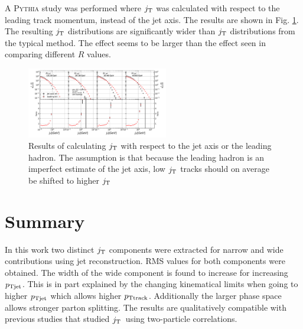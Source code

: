 A \textsc{Pythia} study was performed where $j_{\rm T}$ was calculated with respect to the leading track momentum, instead of the jet axis. The results are shown in Fig. \ref{fig:RefComparison}. The resulting $j_{\rm T}$ distributions are significantly wider than $j_{\rm T}$ distributions from the typical method. The effect seems to be larger than the effect seen in comparing different $R$ values.

\begin{figure}[htp]
\centering
\includegraphics[width=0.55\textwidth]{figures/results/JetVsLeadingRefConst.pdf}
\caption{Results of calculating $j_{\rm T}$ with respect to the jet axis or the leading hadron. The assumption is that because the leading hadron is an imperfect estimate of the jet axis, low $j_{\rm T}$ tracks should on average be shifted to higher $j_{\rm T}$}
\label{fig:RefComparison}
\end{figure}


\pagebreak
\FloatBarrier
\section{Summary}
\label{sec:sum}
In this work two distinct $j_{\rm T}$ components were extracted for narrow and wide contributions using jet reconstruction. RMS values for both components were obtained. The width of the wide component is found to increase for increasing $p_{\rm Tjet}$. This is in part explained by the changing kinematical limits when going to higher $p_{\rm Tjet}$ which allows higher $p_{\rm Ttrack}$. Additionally the larger phase space allows stronger parton splitting. The results are qualitatively compatible with previous studies that studied $j_{\rm T}$ using two-particle correlations.

